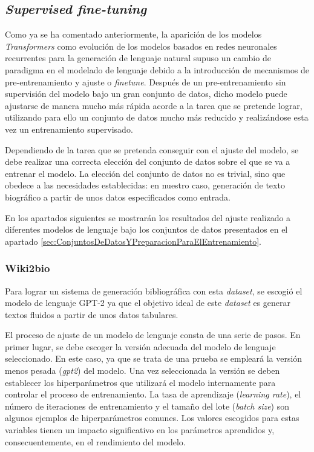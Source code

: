 \subsection{\textit{Supervised fine-tuning}}




Como ya se ha comentado anteriormente, la aparición de los modelos \textit{Transformers} como evolución de los modelos basados en redes neuronales recurrentes para la generación de lenguaje natural supuso un cambio de paradigma en el modelado de lenguaje debido a la introducción de mecanismos de pre-entrenamiento y ajuste o \textit{finetune}. Después de un pre-entrenamiento sin supervisión del modelo bajo un gran conjunto de datos, dicho modelo puede ajustarse de manera mucho más rápida acorde a la tarea que se pretende lograr, utilizando para ello un conjunto de datos mucho más reducido y realizándose esta vez un entrenamiento supervisado. 

Dependiendo de la tarea que se pretenda conseguir con el ajuste del modelo, se debe realizar una correcta elección del conjunto de datos sobre el que se va a entrenar el modelo. La elección del conjunto de datos no es trivial, sino que obedece a las necesidades establecidas: en nuestro caso, generación de texto biográfico a partir de unos datos especificados como entrada. 

En los apartados siguientes se mostrarán los resultados del ajuste realizado a diferentes modelos de lenguaje bajo los conjuntos de datos presentados en el apartado \ref{sec:ConjuntosDeDatosYPreparacionParaElEntrenamiento}.

\subsubsection{Wiki2bio}

Para lograr un sistema de generación bibliográfica con esta \textit{dataset}, se escogió el modelo de lenguaje GPT-2 ya que el objetivo ideal de este \textit{dataset} es generar textos fluidos a partir de unos datos tabulares.

El proceso de ajuste de un modelo de lenguaje consta de una serie de pasos. En primer lugar, se debe escoger la versión adecuada del modelo de lenguaje seleccionado. En este caso, ya que se trata de una prueba se empleará la versión menos pesada (\textit{gpt2}) del modelo. Una vez seleccionada la versión se deben establecer los hiperparámetros que utilizará el modelo internamente para controlar el proceso de entrenamiento. La tasa de aprendizaje (\textit{learning rate}), el número de iteraciones de entrenamiento y el tamaño del lote (\textit{batch size}) son algunos ejemplos de hiperparámetros comunes. Los valores escogidos para estas variables tienen un impacto significativo en los parámetros aprendidos y, consecuentemente, en el rendimiento del modelo. 

